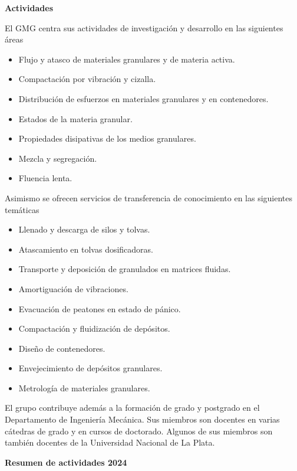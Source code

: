 \documentclass[a4paper,11pt,twoside,final,titlepage,onecolumn,openright]{report}
\begin{document}
\vspace{0.5cm}
{\bf Actividades}
\vspace{0.5cm}

El GMG centra sus actividades de investigación y desarrollo en las siguientes áreas

\begin{itemize}
 \item Flujo y atasco de materiales granulares y de materia activa.
 \item Compactación por vibración y cizalla.
 \item Distribución de esfuerzos en materiales granulares y en contenedores.
 \item Estados de la materia granular.
 \item Propiedades disipativas de los medios granulares.
 \item Mezcla y segregación.
 \item Fluencia lenta.
\end{itemize}

Asimismo se ofrecen servicios de transferencia de conocimiento en las siguientes temáticas

\begin{itemize}
 \item Llenado y descarga de silos y tolvas.
 \item Atascamiento en tolvas dosificadoras.
 \item Transporte y deposición de granulados en matrices fluidas.
 \item Amortiguación de vibraciones.
 \item Evacuación de peatones en estado de pánico.
 \item Compactación y fluidización de depósitos.
 \item Diseño de contenedores.
 \item Envejecimiento de depósitos granulares.
 \item Metrología de materiales granulares.
\end{itemize}

El grupo contribuye además a la formación de grado y postgrado en el Departamento de Ingeniería Mecánica. Sus miembros son docentes en varias cátedras de grado y en cursos de doctorado. Algunos de sus miembros son también docentes de la Universidad Nacional de La Plata.

\vspace{0.5cm}

{\bf Resumen de actividades 2024}
\end{document}
